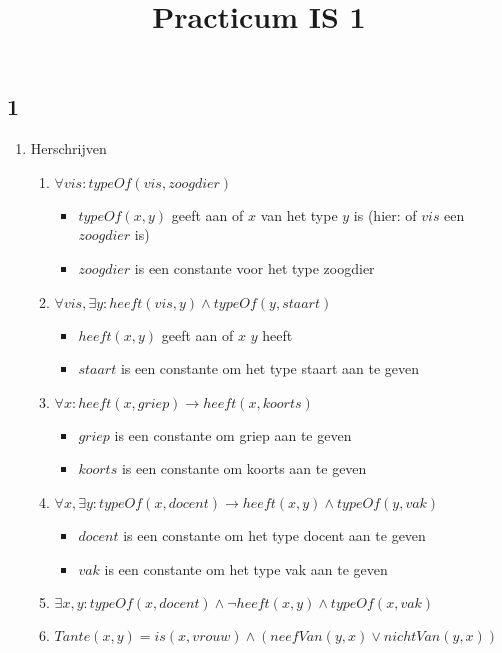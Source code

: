\documentclass[]{article}
\title{Practicum IS 1}
\author{}
\date{}
\begin{document}
  \maketitle
  \subsection*{1}
  \begin{enumerate}[a]
    \item Herschrijven
    \begin{enumerate}[i]
      \item $ \forall vis : typeOf(vis, zoogdier) $
      \begin{itemize}
        \item $typeOf(x,y) $ geeft aan of $x$ van het type $y$ is (hier: of $vis$ een $zoogdier$ is)
        \item $zoogdier$ is een constante voor het type zoogdier
      \end{itemize}
      \item $ \forall vis, \exists y : heeft(vis, y) \land typeOf(y,staart) $
      \begin{itemize}
        \item $heeft(x,y) $ geeft aan of $x$ $y$ heeft
        \item $staart$ is een constante om het type staart aan te geven
      \end{itemize}
      \item $\forall x : heeft(x,griep) \longrightarrow heeft(x,koorts) $
      \begin{itemize}
        \item $griep$ is een constante om griep aan te geven
        \item $koorts$ is een constante om koorts aan te geven
      \end{itemize} %
      \item $ \forall x, \exists y : typeOf(x,docent) \longrightarrow heeft(x, y) \land typeOf(y,vak) $
      \begin{itemize}
        \item $docent$ is een constante om het type docent aan te geven
        \item $vak$ is een constante om het type vak aan te geven
      \end{itemize}
      \item $ \exists x,y : typeOf(x,docent) \land \neg heeft(x,y) \land typeOf(x,vak) $
      \item $ Tante(x,y) = is(x,vrouw) \land (neefVan(y,x) \lor nichtVan(y,x)) $

\end{enumerate}
\end{enumerate}
\end{document}
